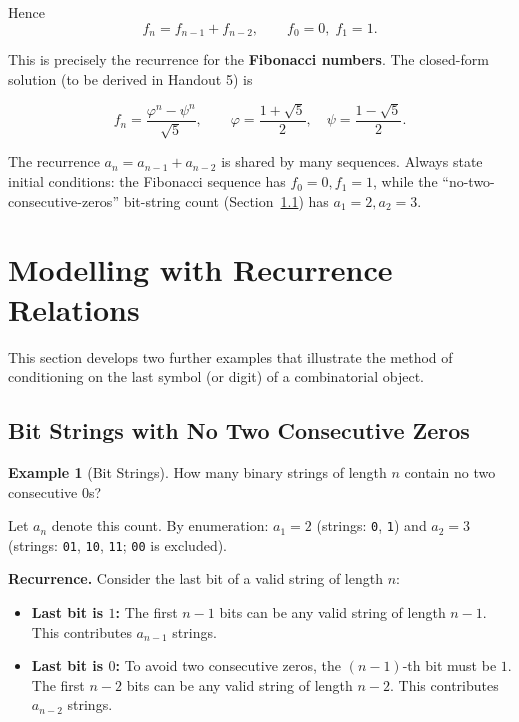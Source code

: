 \documentclass[11pt, a4paper, notitlepage]{report}
\theoremstyle{definition}
\newtheorem{example}[theorem]{Example}
\theoremstyle{remark}
\begin{document}
Hence
\[
  f_n = f_{n-1} + f_{n-2}, \qquad f_0 = 0,\; f_1 = 1.
\]

This is precisely the recurrence for the \textbf{Fibonacci numbers}.  The closed-form solution
(to be derived in Handout 5) is

\begin{keyresult}[title={Closed Form for Fibonacci Numbers (Binet's Formula)}]
\[
  f_n = \frac{\varphi^n - \psi^n}{\sqrt{5}}, \qquad
  \varphi = \frac{1+\sqrt{5}}{2}, \quad \psi = \frac{1-\sqrt{5}}{2}.
\]
\end{keyresult}

\begin{examtip}[title={Initial Conditions Matter}]
The recurrence $a_n = a_{n-1} + a_{n-2}$ is shared by many sequences.  Always state initial
conditions: the Fibonacci sequence has $f_0 = 0, f_1 = 1$, while the ``no-two-consecutive-zeros''
bit-string count (Section~\ref{subsec:strings}) has $a_1 = 2, a_2 = 3$.
\end{examtip}

\section{Modelling with Recurrence Relations}
\label{sec:recurrence-modelling}

This section develops two further examples that illustrate the method of conditioning on the
last symbol (or digit) of a combinatorial object.

\subsection{Bit Strings with No Two Consecutive Zeros}
\label{subsec:strings}

\begin{example}[Bit Strings]
\label{ex:bitstrings}
How many binary strings of length $n$ contain no two consecutive $0$s?
\end{example}

Let $a_n$ denote this count.  By enumeration: $a_1 = 2$ (strings: \texttt{0}, \texttt{1}) and
$a_2 = 3$ (strings: \texttt{01}, \texttt{10}, \texttt{11}; \texttt{00} is excluded).

\textbf{Recurrence.}  Consider the last bit of a valid string of length $n$:

\begin{itemize}
  \item \textbf{Last bit is $1$:} The first $n-1$ bits can be any valid string of length $n-1$.
        This contributes $a_{n-1}$ strings.
  \item \textbf{Last bit is $0$:} To avoid two consecutive zeros, the $(n-1)$-th bit must be
        $1$.  The first $n-2$ bits can be any valid string of length $n-2$.
        This contributes $a_{n-2}$ strings.
\end{itemize}
\end{document}
